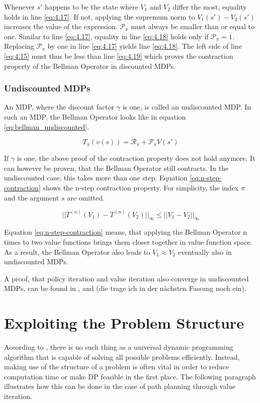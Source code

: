 Whenever $s'$ happens to be the state where $V_1$ and $V_2$ differ the most, equality holds in line \ref{eq:4.17}. If not, applying the supremum norm to $V_1(s')-V_2(s')$ increases the value of the expression. $\mathcal{P}_\pi$ must always be smaller than or equal to one. Similar to line \ref{eq:4.17}, equality in line \ref{eq:4.18} holds only if $\mathcal{P}_\pi=1$. Replacing $\mathcal{P}_\pi$ by one in line \ref{eq:4.17} yields line \ref{eq:4.18}. The left side of line \ref{eq:4.15} must thus be less than line \ref{eq:4.19} which proves the contraction property of the Bellman Operator in discounted MDPs.

\subsubsection*{Undiscounted MDPs}

An MDP, where the discount factor $\gamma$ is one, is called an undiscounted MDP. In such an MDP, the Bellman Operator looks like in equation \ref{eq:bellman_undiscounted}.

\begin{equation}
T_\pi(v(s))=\mathcal{R}_\pi + \mathcal{P}_\pi V(s')
\label{eq:bellman_undiscounted}
\end{equation}

If $\gamma$ is one, the above proof of the contraction property does not hold anymore. It can however be proven, that the Bellman Operator still contracts. In the undiscounted case, this takes more than one step. Equation \ref{eq:n-step-contraction} shows the n-step contraction property. For simplicity, the index $\pi$ and the argument $s$ are omitted.

\begin{equation}
||T^{(n)}(V_1)-T^{(n)}(V_2)||_\infty \leq ||V_1-V_2||_\infty
\label{eq:n-step-contraction}
\end{equation}

Equation \ref{eq:n-step-contraction} means, that applying the Bellman Operator n times to two value functions brings them closer together in value function space. As a result, the Bellman Operator also leads to $V_1 \approx V_2$ eventually also in undiscounted MDPs.

A proof, that policy iteration and value iteration also converge in undiscounted MDPs, can be found in \cite{},\cite{} and \cite{} (die trage ich in der nächsten Fassung noch ein).

\section{Exploiting the Problem Structure}
\label{sec:prob_structure}
According to \cite{Powell2007ADP}, there is no such thing as a universal dynamic programming algorithm that is capable of solving all possible problems efficiently. Instead, making use of the structure of a problem is often vital in order to reduce computation time or make DP feasible in the first place. The following paragraph illustrates how this can be done in the case of path planning through value iteration.

